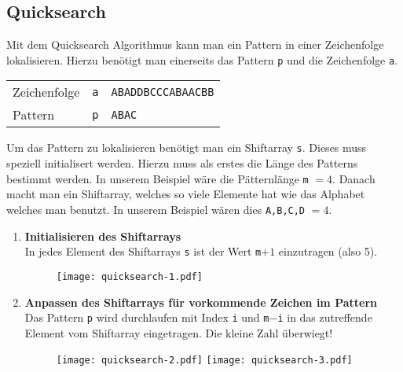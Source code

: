 




\newpage
\subsection{Quicksearch}

Mit dem Quicksearch Algorithmus kann man ein Pattern in einer 
Zeichenfolge lokalisieren. Hierzu benötigt man einerseits das
Pattern \verb!p! und die Zeichenfolge \verb!a!.

\begin{table}[h!]
	\centering
	\begin{tabular}{l c l}
		Zeichenfolge
			& \verb!a!
			& \verb!ABADDBCCCABAACBB! \\
		Pattern
			& \verb!p!
			& \verb!ABAC! \\
	\end{tabular}
\end{table}

\noindent
Um das Pattern zu lokalisieren benötigt man ein Shiftarray \verb!s!.
Dieses muss speziell initialisert werden. Hierzu muss als erstes die 
Länge des Patterns bestimmt werden. In unserem Beispiel wäre die
Pätternlänge \verb!m! $=4$. Danach macht man ein Shiftarray, welches
so viele Elemente hat wie das Alphabet welches man benutzt. In unserem
Beispiel wären dies \verb!A,B,C,D! $=4$.

\begin{enumerate}
	\item \textbf{Initialisieren des Shiftarrays} \\
		In jedes Element des Shiftarrays \verb!s! ist der
		Wert \verb!m!$+1$ einzutragen (also 5).
		\begin{figure}[h!]
			\centering
			\texttt{[image: quicksearch-1.pdf]} 
		\end{figure}
	\item \textbf{Anpassen des Shiftarrays für vorkommende Zeichen 
		im Pattern} \\
		Das Pattern \verb!p! wird durchlaufen mit Index \verb!i!
		und \verb!m!$-$\verb!i! in das zutreffende Element vom
		Shiftarray eingetragen. Die kleine Zahl überwiegt!
		\begin{figure}[h!]
			\centering
			\hfill{} \hfill{}
			\texttt{[image: quicksearch-2.pdf]}
			\hfill{}
			\texttt{[image: quicksearch-3.pdf]}
		\end{figure}
\end{enumerate}

